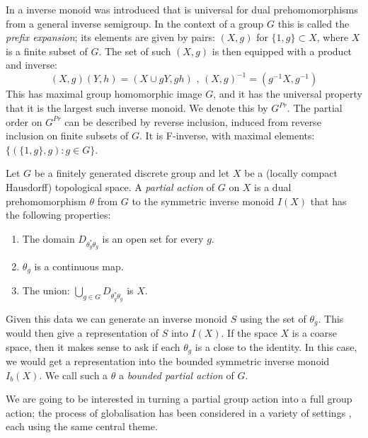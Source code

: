 \begin{example}
\begin{example}
In \cite{MR745358,MR2221438} a inverse monoid was introduced that is universal for dual prehomomorphisms from a general inverse semigroup. In the context of a group $G$ this is called the \textit{prefix expansion}; its elements are given by pairs: $(X,g)$ for $\lbrace 1,g\rbrace \subset X$, where $X$ is a finite subset of $G$. The set of such $(X,g)$ is then equipped with a product and inverse:
\begin{equation*}
(X,g)(Y,h) = (X\cup gY,gh)\mbox{ , } (X,g)^{-1}=(g^{-1}X,g^{-1})
\end{equation*}
This has maximal group homomorphic image $G$, and it has the universal property that it is the largest such inverse monoid. We denote this by $G^{Pr}$. The partial order on $G^{Pr}$ can be described by reverse inclusion, induced from reverse inclusion on finite subsets of $G$. It is F-inverse, with maximal elements: $\lbrace(\lbrace 1,g \rbrace, g):g \in G \rbrace$.
\end{example}

\begin{definition}
Let $G$ be a finitely generated discrete group and let $X$ be a (locally compact Hausdorff) topological space. A \textit{partial action} of $G$ on $X$ is a dual prehomomorphism $\theta$ from $G$ to the symmetric inverse monoid $I(X)$ that has the following properties:
\begin{enumerate}
\item The domain $D_{\theta_{g}^{*}\theta_{g}}$ is an open set for every $g$.
\item $\theta_{g}$ is a continuous map.
\item The union: $\bigcup_{g \in G}D_{\theta_{g}^{*}\theta_{g}}$ is $X$.
\end{enumerate}
\end{definition}

Given this data we can generate an inverse monoid $S$ using the set of $\theta_{g}$. This would then give a representation of $S$ into $I(X)$. If the space $X$ is a coarse space, then it makes sense to ask if each $\theta_{g}$ is a close to the identity. In this case, we would get a representation into the bounded symmetric inverse monoid $I_{b}(X)$. We call such a $\theta$ a \textit{bounded partial action} of $G$.

We are going to be interested in turning a partial group action into a full group action; the process of globalisation has been considered in a variety of settings \cite{MR0160848, MR1798993, MR2041539, MR2419858, MR1900993, Milan-Steinberg}, each using the same central theme.


\end{example}
